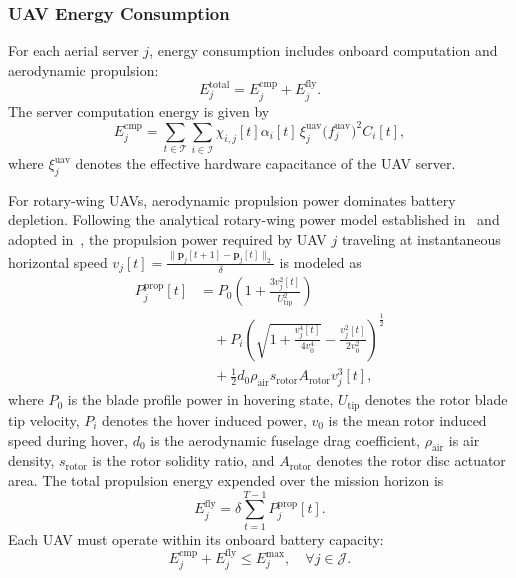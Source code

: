 \documentclass[journal]{IEEEtran}
\begin{document}
\subsubsection{UAV Energy Consumption}
For each aerial server $j$, energy consumption includes onboard computation and aerodynamic propulsion:
\begin{equation}
    E_j^{\mathrm{total}} = E_j^{\mathrm{cmp}} + E_j^{\mathrm{fly}}.
    \label{eq:uav_energy_components}
\end{equation}
The server computation energy is given by
\begin{equation}
    E_j^{\mathrm{cmp}} = \sum_{t \in \mathcal{T}} \sum_{i \in \mathcal{I}} \chi_{i,j}[t] \alpha_i[t] \, \xi_j^{\mathrm{uav}} \bigl(f_j^{\mathrm{uav}}\bigr)^2 C_i[t],
    \label{eq:uav_cmp_energy_total}
\end{equation}
where $\xi_j^{\mathrm{uav}}$ denotes the effective hardware capacitance of the UAV server.

For rotary-wing UAVs, aerodynamic propulsion power dominates battery depletion. Following the analytical rotary-wing power model established in~\cite{8937764} and adopted in~\cite{li2026tnse}, the propulsion power required by UAV $j$ traveling at instantaneous horizontal speed $v_j[t] = \frac{\|\mathbf{p}_j[t+1] - \mathbf{p}_j[t]\|_2}{\delta}$ is modeled as
\begin{equation}
\begin{split}
    P_j^{\mathrm{prop}}[t] &= P_0 \left(1 + \frac{3 v_j^2[t]}{U_{\mathrm{tip}}^2}\right) \\
    &\quad + P_i \left(\sqrt{1 + \frac{v_j^4[t]}{4 v_0^4}} - \frac{v_j^2[t]}{2 v_0^2}\right)^{\frac{1}{2}} \\
    &\quad + \frac{1}{2} d_0 \rho_{\mathrm{air}} s_{\mathrm{rotor}} A_{\mathrm{rotor}} v_j^3[t],
    \label{eq:uav_prop_power}
\end{split}
\end{equation}
where $P_0$ is the blade profile power in hovering state, $U_{\mathrm{tip}}$ denotes the rotor blade tip velocity, $P_i$ denotes the hover induced power, $v_0$ is the mean rotor induced speed during hover, $d_0$ is the aerodynamic fuselage drag coefficient, $\rho_{\mathrm{air}}$ is air density, $s_{\mathrm{rotor}}$ is the rotor solidity ratio, and $A_{\mathrm{rotor}}$ denotes the rotor disc actuator area. The total propulsion energy expended over the mission horizon is
\begin{equation}
    E_j^{\mathrm{fly}} = \delta \sum_{t = 1}^{T-1} P_j^{\mathrm{prop}}[t].
    \label{eq:uav_fly_energy_total}
\end{equation}
Each UAV must operate within its onboard battery capacity:
\begin{equation}
    E_j^{\mathrm{cmp}} + E_j^{\mathrm{fly}} \le E_j^{\max}, \quad \forall j \in \mathcal{J}.
    \label{eq:uav_energy_budget}
\end{equation}
\end{document}

